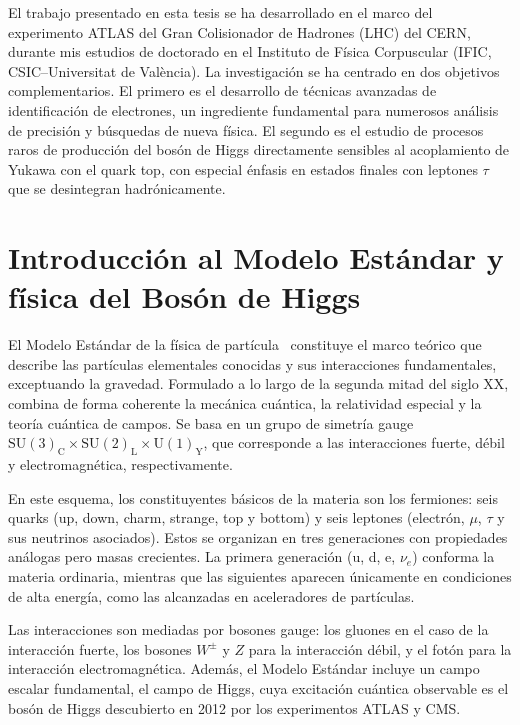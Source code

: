 El trabajo presentado en esta tesis se ha desarrollado en el marco del experimento ATLAS del Gran Colisionador de Hadrones (LHC) del CERN, durante mis estudios de doctorado en el Instituto de Física Corpuscular (IFIC, CSIC–Universitat de València).
La investigación se ha centrado en dos objetivos complementarios. El primero es el desarrollo de técnicas avanzadas de identificación de electrones, un ingrediente fundamental para numerosos análisis de precisión y búsquedas de nueva física. 
El segundo es el estudio de procesos raros de producción del bosón de Higgs directamente sensibles al acoplamiento de Yukawa con el quark top, con especial énfasis en estados finales con leptones $\tau$ que se desintegran hadrónicamente.

\section*{Introducción al Modelo Estándar y física del Bosón de Higgs}

El Modelo Estándar de la física de partícula~\cite{Glashow,Weinberg,Salam} constituye el marco teórico que describe las partículas elementales conocidas y sus interacciones fundamentales, exceptuando la gravedad. 
Formulado a lo largo de la segunda mitad del siglo XX, combina de forma coherente la mecánica cuántica, la relatividad especial y la teoría cuántica de campos. 
Se basa en un grupo de simetría gauge \(\mathrm{SU(3)_{C} \times SU(2)_{L} \times U(1)_{Y}}\), que corresponde a las interacciones fuerte, débil y electromagnética, respectivamente.  

En este esquema, los constituyentes básicos de la materia son los fermiones: seis quarks (up, down, charm, strange, top y bottom) y seis leptones (electrón, $\mu$, $\tau$ y sus neutrinos asociados). Estos se organizan en tres generaciones con propiedades análogas pero masas crecientes. La primera generación (u, d, e, \(\nu_{e}\)) conforma la materia ordinaria, mientras que las siguientes aparecen únicamente en condiciones de alta energía, como las alcanzadas en aceleradores de partículas.  

Las interacciones son mediadas por bosones gauge: los gluones en el caso de la interacción fuerte, los bosones \(W^\pm\) y \(Z\) para la interacción débil, y el fotón para la interacción electromagnética. Además, el Modelo Estándar incluye un campo escalar fundamental, el campo de Higgs, cuya excitación cuántica observable es el bosón de Higgs descubierto en 2012 por los experimentos ATLAS y CMS.  


